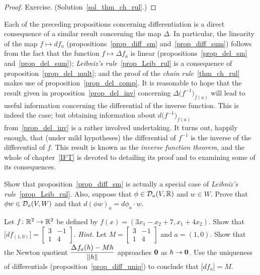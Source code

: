 \begin{proof} Exercise.  (Solution~\ref{sol_thm_ch_rul}.)  \ns   \end{proof}

Each of the preceding propositions concerning differentiation is a direct consequence of a
similar result concerning the map $\Delta$. In particular, the linearity of the map $f \mapsto
df_a$ (propositions~\ref{prop_diff_sm} and~\ref{prop_diff_sum}) follows from the fact that the
function $f \mapsto \Delta f_a$ is linear (propositions~\ref{prop_del_sm}
and~\ref{prop_del_sum}); \emph{Leibniz's rule}~\ref{prop_Leib_rul} is a consequence of
proposition~\ref{prop_del_mult}; and the proof of the \emph{chain rule}~\ref{thm_ch_rul} makes
use of proposition~\ref{prop_del_comp}.  It is reasonable to hope that the result given in
proposition~\ref{prop_del_inv} concerning $\Delta\bigl(f^{-1}\bigr)_{f(a)}$ will lead to
useful information concerning the differential of the inverse function. This is indeed the
case; but obtaining information about $d\bigl(f^{-1}\bigr)_{f(a)}$ from~\ref{prop_del_inv} is
a rather involved undertaking.  It turns out, happily enough, that (under mild hypotheses) the
differential of $f^{-1}$ is the inverse of the differential of $f$.  This result is known as
the \emph{inverse function theorem}, and the whole of chapter~\ref{IFT} is devoted to
detailing its proof and to examining some of its consequences.

\begin{prob} Show that proposition~\ref{prop_diff_sm} is actually a special case of
\emph{Leibniz's rule}~\ref{prop_Leib_rul}.  Also, suppose that $\phi \in \mathcal{D}_a(V,\mathbb{R})$ and
$w \in W$.  Prove that $\phi w \in \mathcal{D}_a(V,W)$ and that $d(\phi w)_a = d\phi_a \cdot w$.
\end{prob}

\begin{prob}  Let $f \colon \mathbb{R}^2 \rightarrow \mathbb{R}^2$ be defined by $f(x) = (3x_1 - x_2 + 7, x_1 + 4x_2)$.
Show that $\bigl[df_{(1,0)}\bigr] =
 \begin{bmatrix}
     3  &  -1 \\
     1  &  4
 \end{bmatrix}$.  \emph{Hint.}  Let
 $M = \begin{bmatrix}
            3  &  -1 \\
            1  &  4
      \end{bmatrix}$ and $a = (1,0)$.  Show that the Newton quotient
$\dfrac{\mathstrut\Delta^{\mathstrut} f_a(h) - Mh}{\lVert h\rVert}$ approaches $\mathbf{0}$ as $h \rightarrow \mathbf{0}$. Use the uniqueness of differentials (proposition~\ref{prop_diff_uniq}) to conclude that
$\bigl[df_a\bigr] = M$.
\end{prob}

